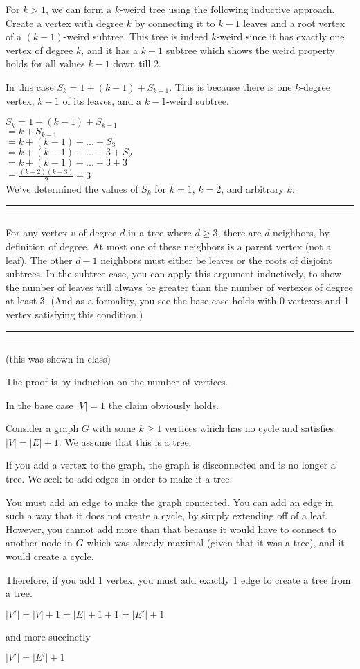 \documentclass[11pt,letterpaper]{article}
\newcommand{\question}[1] {\vspace{.25in} \hrule\vspace{0.5em}
\noindent{\bf #1} \vspace{0.5em}
\hrule \vspace{.10in}}
\begin{document}
For $k>1$, we can form a $k$-weird tree using the following inductive approach. Create a vertex with degree $k$ by connecting it to $k-1$ leaves and a root vertex of a $(k-1)$-weird subtree.
This tree is indeed $k$-weird since it has exactly one vertex of degree $k$, and it has a $k-1$ subtree which shows the weird property holds for all values $k-1$ down till 2.

In this case $S_k = 1 + (k-1) + S_{k-1}$. This is because there is one $k$-degree vertex, $k-1$ of its leaves, and a $k-1$-weird subtree.

$S_k = 1 + (k-1) + S_{k-1}$\\
$    = k + S_{k-1}$\\
$    = k + (k-1) + ... + S_3$\\
$    = k + (k-1) + ... + 3 + S_2$\\
$    = k + (k-1) + ... + 3 + 3$\\
$    = \frac{(k-2)(k+3)}{2} + 3$\\

We've determined the values of $S_k$ for $k=1$, $k=2$, and arbitrary $k$.

\question{6}
For any vertex $v$ of degree $d$ in a tree where $d \geq 3$, there are $d$ neighbors, by definition of degree.
At most one of these neighbors is a parent vertex (not a leaf). The other $d-1$ neighbors must either be leaves or the roots of disjoint subtrees.
In the subtree case, you can apply this argument inductively, to show the number of leaves will always be greater than the number of vertexes of degree at least 3.
(And as a formality, you see the base case holds with 0 vertexes and 1 vertex satisfying this condition.)


\question{7}
(this was shown in class)

The proof is by induction on the number of vertices.

In the base case $|V| = 1$ the claim obviously holds.

Consider a graph $G$ with some $k \geq 1$ vertices which has no cycle and satisfies $|V| = |E| + 1$.
We assume that this is a tree.

If you add a vertex to the graph, the graph is disconnected and is no longer a tree. We seek to add edges in order to make it a tree.

You must add an edge to make the graph connected. You can add an edge in such a way that it does not create
a cycle, by simply extending off of a leaf. However, you cannot add more than that because it would have to connect
to another node in $G$ which was already maximal (given that it was a tree), and it would create a cycle.

Therefore, if you add 1 vertex, you must add exactly 1 edge to create a tree from a tree.

$|V'| = |V| + 1 = |E| + 1 + 1 = |E'| + 1$

and more succinctly

$|V'| = |E'| + 1$
\end{document}
